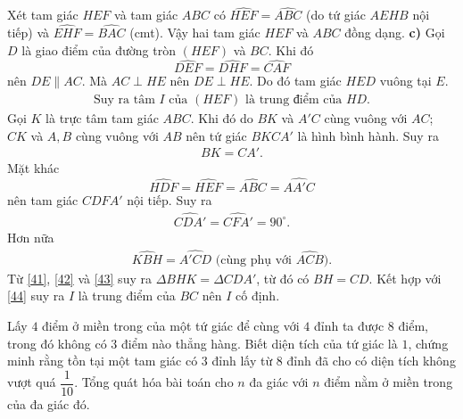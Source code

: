\begin{ex}
{			Xét tam giác $HEF$ và tam giác $ABC$ có $\widehat{HEF}=\widehat{ABC}$ (do tứ giác $AEHB$ nội tiếp) và $\widehat{EHF}=\widehat{BAC}$ (cmt). Vậy hai tam giác $HEF$ và $ABC$ đồng dạng.
			\textbf{c)} Gọi $D$ là giao điểm của đường tròn $(HEF)$ và $BC$. Khi đó 
			$$\widehat{DEF}=\widehat{DHF}=\widehat{CAF}$$
			nên $DE\parallel AC$. Mà $AC\perp HE$ nên $DE\perp HE$. Do đó tam giác $HED$ vuông tại $E$. 
			\begin{align}\label{44}
			\text{Suy ra tâm $I$ của $(HEF)$ là trung điểm của $HD$.}
			\end{align}
			Gọi $K$ là trực tâm tam giác $ABC$. Khi đó do $BK$ và $A'C$ cùng vuông với $AC$; $CK$ và $A,B$ cùng vuông với $AB$ nên tứ giác $BKCA'$ là hình bình hành. Suy ra 
			\begin{align}\label{41}
			BK=CA'.
			\end{align}
			Mặt khác $$\widehat{HDF}=\widehat{HEF}=\widehat{ABC}=\widehat{AA'C}$$
			nên tam giác $CDFA'$ nội tiếp. Suy ra 
			\begin{align}\label{42}
			\widehat{CDA'}=\widehat{CFA'}=90^\circ.
			\end{align}
			Hơn nữa 
			\begin{align}\label{43}
			\widehat{KBH}=\widehat{A'CD}\text{ (cùng phụ với $\widehat{ACB}$)}.
			\end{align}
			Từ \eqref{41}, \eqref{42} và \eqref{43} suy ra $\Delta BHK=\Delta CDA'$, từ đó có $BH=CD$. Kết hợp với \eqref{44} suy ra $I$ là trung điểm của $BC$ nên $I$ cố định.
	}
\end{ex}
\begin{ex}%
	Lấy $4$ điểm ở miền trong của một tứ giác để cùng với $4$ đỉnh ta được $8$  điểm, trong đó không có $3$ điểm nào thẳng hàng. Biết diện tích của tứ giác là $1$, chứng minh rằng tồn tại một tam giác có $3$ đỉnh lấy từ $8$ đỉnh đã cho có diện tích không vượt quá $\dfrac{1}{10}$. Tổng quát hóa bài toán cho $n$ đa giác với $n$ điểm nằm ở miền trong của đa giác đó.
\end{ex}


